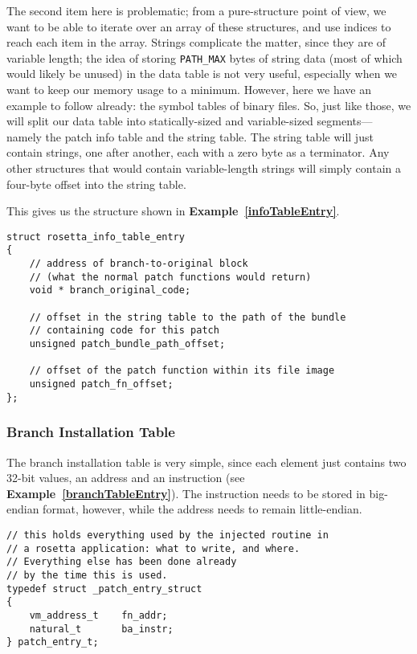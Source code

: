\documentclass[english]{article}
\begin{document}
The second item here is problematic; from a pure-structure point of view, we want to be able to iterate over an array of these structures, and use indices to reach each item in the array. Strings complicate the matter, since they are of variable length; the idea of storing \texttt{PATH\_MAX} bytes of string data (most of which would likely be unused) in the data table is not very useful, especially when we want to keep our memory usage to a minimum. However, here we have an example to follow already: the symbol tables of binary files. So, just like those, we will split our data table into statically-sized and variable-sized segments--- namely the patch info table and the string table. The string table will just contain strings, one after another, each with a zero byte as a terminator. Any other structures that would contain variable-length strings will simply contain a four-byte offset into the string table.

This gives us the structure shown in \textbf{Example~\ref{infoTableEntry}}.

\begin{lstlisting}[label= infoTableEntry, caption=Rosetta info table entry structure.]
struct rosetta_info_table_entry
{
    // address of branch-to-original block
    // (what the normal patch functions would return)
    void * branch_original_code;

    // offset in the string table to the path of the bundle
    // containing code for this patch
    unsigned patch_bundle_path_offset;

    // offset of the patch function within its file image
    unsigned patch_fn_offset;
};
\end{lstlisting}

\subsubsection{Branch Installation Table}
The branch installation table is very simple, since each element just contains two 32-bit values, an address and an instruction (see \textbf{Example~\ref{branchTableEntry}}). The instruction needs to be stored in big-endian format, however, while the address needs to remain little-endian.

\begin{lstlisting}[label=branchTableEntry, caption=Branch table element structure.]
// this holds everything used by the injected routine in 
// a rosetta application: what to write, and where. 
// Everything else has been done already 
// by the time this is used.
typedef struct _patch_entry_struct
{
    vm_address_t    fn_addr;
    natural_t       ba_instr;
} patch_entry_t;
\end{lstlisting}
\end{document}
